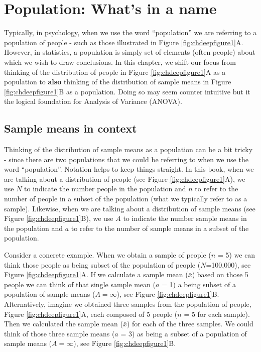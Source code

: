\documentclass[
]{krantz}
\begin{document}
\hypertarget{population-whats-in-a-name}{%
\section{Population: What's in a name}\label{population-whats-in-a-name}}

Typically, in psychology, when we use the word ``population'' we are referring to a population of people - such as those illustrated in Figure \ref{fig:chdeepfigure1}A. However, in statistics, a population is simply set of elements (often people) about which we wish to draw conclusions. In this chapter, we shift our focus from thinking of the distribution of people in Figure \ref{fig:chdeepfigure1}A as a population to \textbf{also} thinking of the distribution of sample means in Figure \ref{fig:chdeepfigure1}B as a population. Doing so may seem counter intuitive but it the logical foundation for Analysis of Variance (ANOVA).

\hypertarget{sample-means-in-context}{%
\subsection{Sample means in context}\label{sample-means-in-context}}

Thinking of the distribution of sample means as a population can be a bit tricky - since there are two populations that we could be referring to when we use the word ``population''. Notation helps to keep things straight. In this book, when we are talking about a distribution of people (see Figure \ref{fig:chdeepfigure1}A), we use \(N\) to indicate the number people in the population and \(n\) to refer to the number of people in a subset of the population (what we typically refer to as a sample). Likewise, when we are talking about a distribution of sample means (see Figure \ref{fig:chdeepfigure1}B), we use \(A\) to indicate the number sample means in the population and \(a\) to refer to the number of sample means in a subset of the population.

Consider a concrete example. When we obtain a sample of people (\(n\) = 5) we can think those people as being subset of the population of people (\(N\)=100,000), see Figure \ref{fig:chdeepfigure1}A. If we calculate a sample mean (\(\bar{x}\)) based on those 5 people we can think of that single sample mean (\(a\) = 1) a being subset of a population of sample means (\(A = \infty\)), see Figure \ref{fig:chdeepfigure1}B. Alternatively, imagine we obtained three samples from the population of people, Figure \ref{fig:chdeepfigure1}A, each composed of 5 people (\(n\) = 5 for each sample). Then we calculated the sample mean (\(\bar{x}\)) for each of the three samples. We could think of those three sample means (\(a\) = 3) as being a subset of a population of sample means (\(A = \infty\)), see Figure \ref{fig:chdeepfigure1}B.
\end{document}
